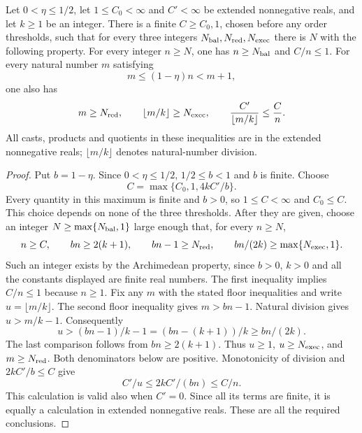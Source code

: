 \begin{lemma}
Let $0<\eta\leq1/2$, let $1\leq C_0<\infty$ and $C'<\infty$ be extended
nonnegative reals, and let $k\geq1$ be an integer. There is a finite
$C\geq C_0,1$, chosen before any order thresholds, such that for every
three integers $N_{\rm bal},N_{\rm red},N_{\rm exec}$ there is $N$ with the
following property. For every integer $n\geq N$, one has
$n\geq N_{\rm bal}$ and $C/n\leq1$. For every natural number $m$ satisfying
\[
 m\leq(1-\eta)n<m+1,
\]
one also has
\[
 m\geq N_{\rm red},\qquad \lfloor m/k\rfloor\geq N_{\rm exec},\qquad
 \frac{C'}{\lfloor m/k\rfloor}\leq\frac Cn.
\]
All casts, products and quotients in these inequalities are in the extended
nonnegative reals; $\lfloor m/k\rfloor$ denotes natural-number division.
\end{lemma}
\begin{proof}
Put $b=1-\eta$. Since $0<\eta\leq1/2$, $1/2\leq b<1$ and $b$ is finite.
Choose
\[
 C=\max\{C_0,1,4kC'/b\}.
\]
Every quantity in this maximum is finite and $b>0$, so $1\leq C<\infty$
and $C_0\leq C$. This choice depends on none of the three thresholds.
After they are given, choose an integer $N\geq\max\{N_{\rm bal},1\}$
large enough that, for every $n\geq N$,
\[
 n\geq C,\qquad bn\geq2(k+1),\qquad
 bn-1\geq N_{\rm red},\qquad bn/(2k)\geq\max\{N_{\rm exec},1\}.
\]
Such an integer exists by the Archimedean property, since $b>0$, $k>0$
and all the constants displayed are finite real numbers. The first inequality
implies $C/n\leq1$ because $n\geq1$.
Fix any $m$ with the stated floor inequalities and write $u=\lfloor m/k\rfloor$.
The second floor inequality gives $m>bn-1$. Natural division gives
$u>m/k-1$. Consequently
\[
 u>(bn-1)/k-1=(bn-(k+1))/k\geq bn/(2k).
\]
The last comparison follows from $bn\geq2(k+1)$. Thus $u\geq1$,
$u\geq N_{\rm exec}$, and $m\geq N_{\rm red}$. Both denominators below
are positive. Monotonicity of division and $2kC'/b\leq C$ give
\[
 C'/u\leq 2kC'/(bn)\leq C/n.
\]
This calculation is valid also when $C'=0$. Since all its terms are finite,
it is equally a calculation in extended nonnegative reals. These are all
the required conclusions.
\end{proof}

